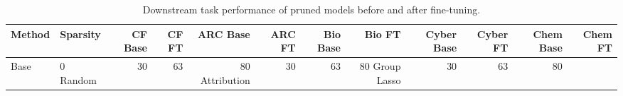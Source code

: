 \begin{table}[htbp]
\centering
\caption{Downstream task performance of pruned models before and after fine-tuning.}
\label{tab:pruned_results}
\begin{tabular}{llrrrrrrrrrr}
\toprule
\textbf{Method} & \textbf{Sparsity} & CF Base & CF FT & ARC Base & ARC FT & Bio Base & Bio FT & Cyber Base & Cyber FT & Chem Base & Chem FT \\
\midrule
Base & 0%
\midrule
Random & 30%
 & 63%
 & 80%
\midrule
Attribution & 30%
 & 63%
 & 80%
\midrule
Group Lasso & 30%
 & 63%
 & 80%
\bottomrule
\end{tabular}
\end{table}